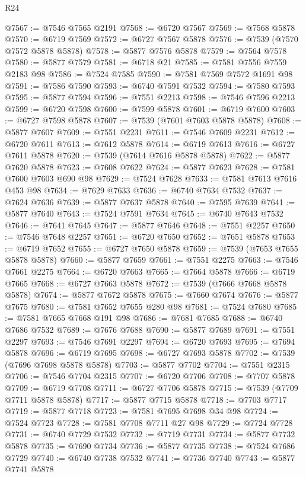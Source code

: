 \begin{lexlean}{R24}
\begin{coremodule}
@7567 := @7546 @7565 @2191
@7568 := @6720 @7567
@7569 := @7568 @5878
@7570 := @6719 @7569
@7572 := @6727 @7567 @5878
@7576 := @7539 (@7570 @7572 @5878 @5878)
@7578 := @5877 @7576 @5878
@7579 := @7564 @7578
@7580 := @5877 @7579
@7581 := @6718 @21
@7585 := @7581 @7556 @7559 @2183 @98
@7586 := @7524 @7585
@7590 := @7581 @7569 @7572 @1691 @98
@7591 := @7586 @7590
@7593 := @6740 @7591 @7532
@7594 := @7580 @7593
@7595 := @5877 @7594
@7596 := @7551 @2213
@7598 := @7546 @7596 @2213
@7599 := @6720 @7598
@7600 := @7599 @5878
@7601 := @6719 @7600
@7603 := @6727 @7598 @5878
@7607 := @7539 (@7601 @7603 @5878 @5878)
@7608 := @5877 @7607
@7609 := @7551 @2231
@7611 := @7546 @7609 @2231
@7612 := @6720 @7611
@7613 := @7612 @5878
@7614 := @6719 @7613
@7616 := @6727 @7611 @5878
@7620 := @7539 (@7614 @7616 @5878 @5878)
@7622 := @5877 @7620 @5878
@7623 := @7608 @7622
@7624 := @5877 @7623
@7628 := @7581 @7600 @7603 @690 @98
@7629 := @7524 @7628
@7633 := @7581 @7613 @7616 @453 @98
@7634 := @7629 @7633
@7636 := @6740 @7634 @7532
@7637 := @7624 @7636
@7639 := @5877 @7637 @5878
@7640 := @7595 @7639
@7641 := @5877 @7640
@7643 := @7524 @7591 @7634
@7645 := @6740 @7643 @7532
@7646 := @7641 @7645
@7647 := @5877 @7646
@7648 := @7551 @2257
@7650 := @7546 @7648 @2257
@7651 := @6720 @7650
@7652 := @7651 @5878
@7653 := @6719 @7652
@7655 := @6727 @7650 @5878
@7659 := @7539 (@7653 @7655 @5878 @5878)
@7660 := @5877 @7659
@7661 := @7551 @2275
@7663 := @7546 @7661 @2275
@7664 := @6720 @7663
@7665 := @7664 @5878
@7666 := @6719 @7665
@7668 := @6727 @7663 @5878
@7672 := @7539 (@7666 @7668 @5878 @5878)
@7674 := @5877 @7672 @5878
@7675 := @7660 @7674
@7676 := @5877 @7675
@7680 := @7581 @7652 @7655 @280 @98
@7681 := @7524 @7680
@7685 := @7581 @7665 @7668 @191 @98
@7686 := @7681 @7685
@7688 := @6740 @7686 @7532
@7689 := @7676 @7688
@7690 := @5877 @7689
@7691 := @7551 @2297
@7693 := @7546 @7691 @2297
@7694 := @6720 @7693
@7695 := @7694 @5878
@7696 := @6719 @7695
@7698 := @6727 @7693 @5878
@7702 := @7539 (@7696 @7698 @5878 @5878)
@7703 := @5877 @7702
@7704 := @7551 @2315
@7706 := @7546 @7704 @2315
@7707 := @6720 @7706
@7708 := @7707 @5878
@7709 := @6719 @7708
@7711 := @6727 @7706 @5878
@7715 := @7539 (@7709 @7711 @5878 @5878)
@7717 := @5877 @7715 @5878
@7718 := @7703 @7717
@7719 := @5877 @7718
@7723 := @7581 @7695 @7698 @34 @98
@7724 := @7524 @7723
@7728 := @7581 @7708 @7711 @27 @98
@7729 := @7724 @7728
@7731 := @6740 @7729 @7532
@7732 := @7719 @7731
@7734 := @5877 @7732 @5878
@7735 := @7690 @7734
@7736 := @5877 @7735
@7738 := @7524 @7686 @7729
@7740 := @6740 @7738 @7532
@7741 := @7736 @7740
@7743 := @5877 @7741 @5878

\end{coremodule}
\end{lexlean}
